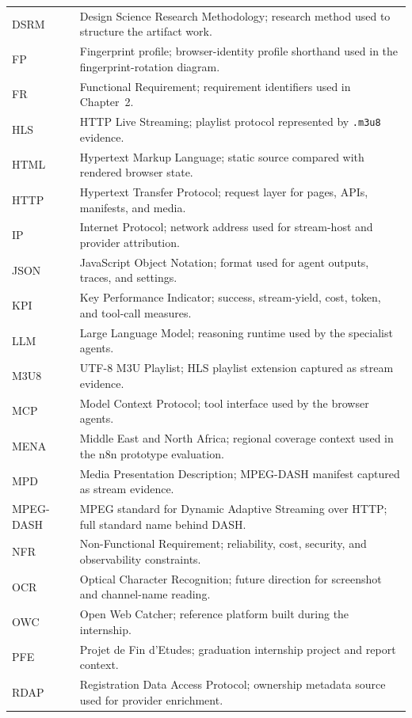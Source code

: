 \begin{longtable}{@{}Q{2.65cm}>{\raggedright\arraybackslash}p{12.75cm}@{}}
DSRM & Design Science Research Methodology; research method used to structure the artifact work. \\
FP & Fingerprint profile; browser-identity profile shorthand used in the fingerprint-rotation diagram. \\
FR & Functional Requirement; requirement identifiers used in Chapter~2. \\
HLS & HTTP Live Streaming; playlist protocol represented by \texttt{.m3u8} evidence. \\
HTML & Hypertext Markup Language; static source compared with rendered browser state. \\
HTTP & Hypertext Transfer Protocol; request layer for pages, APIs, manifests, and media. \\
IP & Internet Protocol; network address used for stream-host and provider attribution. \\
JSON & JavaScript Object Notation; format used for agent outputs, traces, and settings. \\
KPI & Key Performance Indicator; success, stream-yield, cost, token, and tool-call measures. \\
LLM & Large Language Model; reasoning runtime used by the specialist agents. \\
M3U8 & UTF-8 M3U Playlist; HLS playlist extension captured as stream evidence. \\
MCP & Model Context Protocol; tool interface used by the browser agents. \\
\pagebreak
MENA & Middle East and North Africa; regional coverage context used in the n8n prototype evaluation. \\
MPD & Media Presentation Description; MPEG-DASH manifest captured as stream evidence. \\
MPEG-DASH & MPEG standard for Dynamic Adaptive Streaming over HTTP; full standard name behind DASH. \\
NFR & Non-Functional Requirement; reliability, cost, security, and observability constraints. \\
OCR & Optical Character Recognition; future direction for screenshot and channel-name reading. \\
OWC & Open Web Catcher; reference platform built during the internship. \\
PFE & Projet de Fin d'Etudes; graduation internship project and report context. \\
RDAP & Registration Data Access Protocol; ownership metadata source used for provider enrichment. \\

\end{longtable}
